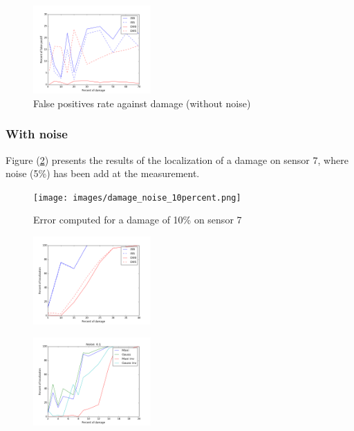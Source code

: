 \documentclass[journal]{IEEEtran}
\begin{document}
\begin{figure}[h!]
  \centering
  \includegraphics[width=0.4\textwidth]{images/fp.png}
  \caption{False positives rate against damage (without noise)}
  \label{fp}
\end{figure}



\subsubsection{With noise}



Figure (\ref{itp_error_noise}) presents the results of the localization of a damage on sensor 7, where noise (5\%) has been add at the measurement.


\begin{figure}[h!]
  \centering
  \texttt{[image: images/damage\_noise\_10percent.png]}
  \caption{Error computed for a damage of 10\% on sensor 7}
  \label{itp_error_noise}
\end{figure}




\begin{figure}[h!]
  \centering
  \includegraphics[width=0.4\textwidth]{images/detect_noise004.png}
  \caption{}
  \label{detect_5noise}
\end{figure}


\begin{figure}[h!]
  \centering
  \includegraphics[width=0.4\textwidth]{images/detect_curve_with_01noise.png}
  \caption{}
  \label{detect_10noise}
\end{figure}
\end{document}
